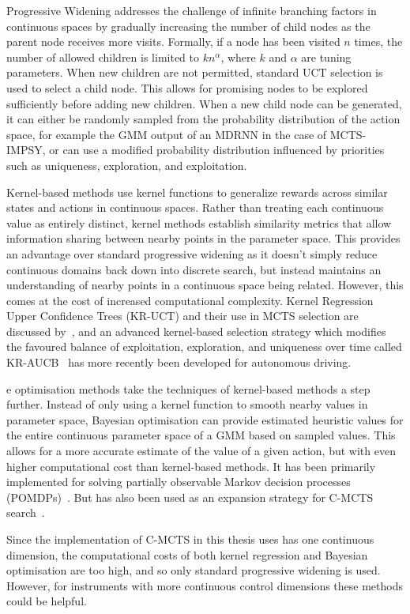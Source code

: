 Progressive Widening addresses the challenge of infinite branching factors in continuous spaces by gradually increasing the number of child nodes as the parent node receives more visits. Formally, if a node has been visited $n$ times, the number of allowed children is limited to $kn^{\alpha}$, where $k$ and $\alpha$ are tuning parameters. When new children are not permitted, standard UCT selection is used to select a child node. This allows for promising nodes to be explored sufficiently before adding new children. When a new child node can be generated, it can either be randomly sampled from the probability distribution of the action space, for example the GMM output of an MDRNN in the case of MCTS-IMPSY, or can use a modified probability distribution influenced by priorities such as uniqueness, exploration, and exploitation.

Kernel-based methods use kernel functions to generalize rewards across similar states and actions in continuous spaces. Rather than treating each continuous value as entirely distinct, kernel methods establish similarity metrics that allow information sharing between nearby points in the parameter space. This provides an advantage over standard progressive widening as it doesn't simply reduce continuous domains back down into discrete search, but instead maintains an understanding of nearby points in a continuous space being related. However, this comes at the cost of increased computational complexity. Kernel Regression Upper Confidence Trees (KR-UCT) and their use in MCTS selection are discussed by~\cite{Lisy2016KRUCT}, and an advanced kernel-based selection strategy which modifies the favoured balance of exploitation, exploration, and uniqueness over time called KR-AUCB~\citep{Lei2021KBTree} has more recently been developed for autonomous driving.

e optimisation methods take the techniques of kernel-based methods a step further. Instead of only using a kernel function to smooth nearby values in parameter space, Bayesian optimisation can provide estimated heuristic values for the entire continuous parameter space of a GMM based on sampled values. This allows for a more accurate estimate of the value of a given action, but with even higher computational cost than kernel-based methods. It has been primarily implemented for solving partially observable Markov decision processes (POMDPs)~\citep{Mern2021BayesianMCTS}. But has also been used as an expansion strategy for C-MCTS search~\citep{Lei2021KBTree}.

Since the implementation of C-MCTS in this thesis uses has one continuous dimension, the computational costs of both kernel regression and Bayesian optimisation are too high, and so only standard progressive widening is used. However, for instruments with more continuous control dimensions these methods could be helpful.

